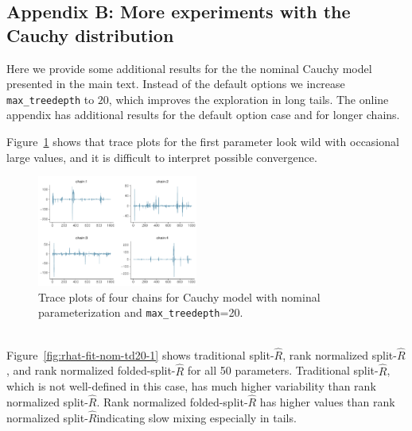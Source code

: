 \documentclass[american,]{article}
\newcommand{\sRhat}{split-$\widehat{R}$}
\theoremstyle{definition}
\begin{document}
\hypertarget{AppendixB}{%
\subsection*{Appendix B: More experiments with the Cauchy distribution}\label{AppendixB}}

Here we provide some additional results for the the nominal Cauchy
model presented in the main text. Instead of the default options we
increase \texttt{max\_treedepth} to \(20\), which improves the
exploration in long tails. The online appendix has additional results
for the default option case and for longer chains.


Figure~\ref{fig:trace-fit-nom-td20-1} shows that trace plots for the first
parameter look wild with occasional large values, and it is difficult
to interpret possible convergence.
\begin{figure}[tp]
  \centering
  \includegraphics[width=0.47\textwidth]{graphics/trace-fit-nom-td20-1.pdf}
  \caption{Trace plots of four chains for Cauchy model with nominal parameterization and \texttt{max\_treedepth}=20.\\~}
  \label{fig:trace-fit-nom-td20-1}
\end{figure}
%
Figure~\ref{fig:rhat-fit-nom-td20-1} shows traditional \sRhat,
rank normalized \sRhat, and rank normalized
folded-split-\(\widehat{R}\) for all 50 parameters. Traditional \sRhat, which is
not well-defined in this case, has much higher variability than rank
normalized \sRhat.  Rank normalized
folded-split-\(\widehat{R}\) has higher values than rank normalized
\sRhat indicating slow mixing especially in tails.
% 
\end{document}
